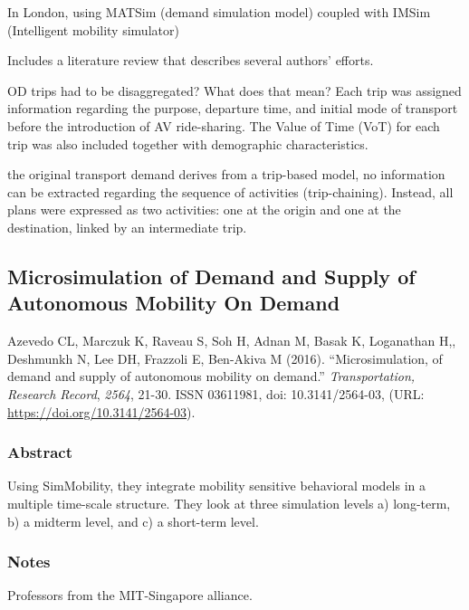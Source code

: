\documentclass[
]{article}
\begin{document}
In London, using MATSim (demand simulation model) coupled with IMSim
(Intelligent mobility simulator)

Includes a literature review that describes several authors' efforts.

OD trips had to be disaggregated? What does that mean? Each trip was
assigned information regarding the purpose, departure time, and initial
mode of transport before the introduction of AV ride-sharing. The Value
of Time (VoT) for each trip was also included together with demographic
characteristics.

the original transport demand derives from a trip-based model, no
information can be extracted regarding the sequence of activities
(trip-chaining). Instead, all plans were expressed as two activities:
one at the origin and one at the destination, linked by an intermediate
trip.

\hypertarget{microsimulation-of-demand-and-supply-of-autonomous-mobility-on-demand}{%
\subsection{Microsimulation of Demand and Supply of Autonomous Mobility
On
Demand}\label{microsimulation-of-demand-and-supply-of-autonomous-mobility-on-demand}}

Azevedo CL, Marczuk K, Raveau S, Soh H, Adnan M, Basak K, Loganathan H,,
Deshmunkh N, Lee DH, Frazzoli E, Ben-Akiva M (2016). ``Microsimulation,
of demand and supply of autonomous mobility on demand.''
\emph{Transportation, Research Record}, \emph{2564}, 21-30. ISSN
03611981, doi: 10.3141/2564-03, (URL:
\url{https://doi.org/10.3141/2564-03}).

\hypertarget{abstract-3}{%
\subsubsection{Abstract}\label{abstract-3}}

Using SimMobility, they integrate mobility sensitive behavioral models
in a multiple time-scale structure. They look at three simulation levels
a) long-term, b) a midterm level, and c) a short-term level.

\hypertarget{notes-3}{%
\subsubsection{Notes}\label{notes-3}}

Professors from the MIT-Singapore alliance.
\end{document}
